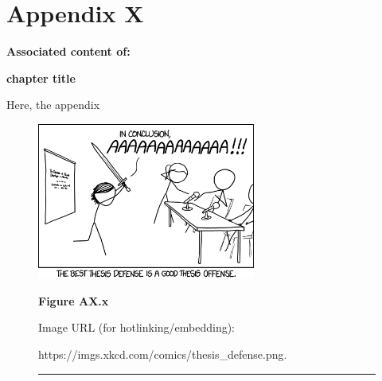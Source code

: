 

\chapter{Appendix X}
\label{appendix7}

\textbf{Associated content of:}
\begin{center}
 \textbf{chapter title}
\end{center}


Here, the appendix
 

\begin{figure}[H]
 \begin{center}
 
\includegraphics[width=0.64\textwidth]{chapters/appendices/figs/thesisdefense.png}
 \end{center}
 \textbf{Figure AX.x} \small{Image URL (for hotlinking/embedding):

 https://imgs.xkcd.com/comics/thesis\_defense.png.}

\rule{1.0\textwidth}{1.0pt}
\end{figure}

